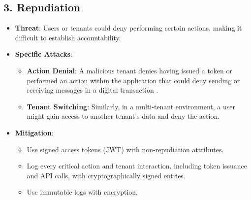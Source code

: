 \subsection*{3. Repudiation}
\begin{itemize}
    \item \textbf{Threat}: Users or tenants could deny performing certain actions, making it difficult to establish accountability.
    \item \textbf{Specific Attacks}:
    \begin{itemize}
        \item \textbf{Action Denial}: A malicious tenant denies having issued a token or performed an action within the application that could deny sending or receiving messages in a digital transaction \citep{repudiation}.
        \item \textbf{Tenant Switching}: Similarly, in a multi-tenant environment, a user might gain access to another tenant’s data and deny the action.
    \end{itemize}
    \item \textbf{Mitigation}:
    \begin{itemize}
        \item Use signed access tokens (JWT) with non-repudiation attributes.
        \item Log every critical action and tenant interaction, including token issuance and API calls, with cryptographically signed entries.
        \item Use immutable logs with encryption.
    \end{itemize}
\end{itemize}

